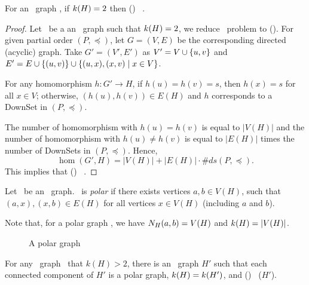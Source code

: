\begin{lemma} \label{lem:triangle-free}
For an \RBA\ graph \mH, if \(k(H)=2\) then \chom(\mH) \mapge\ \cbis\@.
\end{lemma}

\begin{proof}
Let \mH\ be a an \RBA\ graph such that \(k(H)=2\), 
we reduce \cds\ problem to \chom(\mH)\@.
For given partial order \((P,\preceq)\), let \(G=(V,E)\) be the corresponding directed (acyclic) graph.
Take \(G'=(V',E')\) as \(V'= V \cup \{{u,v}\}\) and \(E' = E \cup \{{(u,v)}\} \cup
\{{(u,x),(x,v) \mid x\in V}\}\)\@.

For any homomorphism \(h: G' \to H\), if \(h(u)=h(v)=s\), then \(h(x)=s\) for all \(x\in V\);
otherwise, \((h(u),h(v))\in E(H)\) and \(h\) corresponds to a DownSet in \((P,\preceq)\)\@.

The number of homomorphism with \(h(u)=h(v)\) is equal to \(|V(H)|\) and
the number of homomorphism with \(h(u)\neq h(v)\) is equal to \(|E(H)|\) times the 
number of DownSets in \((P,\preceq)\)\@. Hence,
\[\hom(G',H) = |V(H)| + |E(H)|\cdot \#ds(P,\preceq).\]
This implies that \chom(\mH) \mapge\ \cds\@.
\end{proof}

\begin{defi} 
Let \mH\ be an \RBA\ graph. \mH\ is \emph{polar}
if there exists vertices \(a,b\in V(H)\),
such that \((a,x), (x,b) \in E(H)\) for all vertices \(x \in V(H)\) (including \(a\) and \(b\)).
\end{defi}

Note that, for a polar graph \mH, we have \(N_{H}({a},{b}) = V(H)\) and \(k(H)=|V(H)|\)\@.

\begin{figure}[h]
\center{}
\caption{A polar graph}
\end{figure}

\begin{lemma} \label{lem:k-fixing}
For any \RBA\ graph \mH\ that \(k(H) > 2\), there is an \RBA\ graph
\(H'\) such that  each connected component of \(H'\) is a
polar graph, \(k(H) = k(H')\), and
\chom(\mH) \mapge\ \chom(\(H'\)).
\end{lemma}

